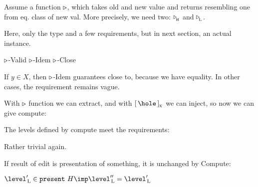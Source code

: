 Assume a function $\triangleright$, which takes old and new value and returns resembling one from eq. class of new val. More precisely, we need two: $\triangleright_{\!_\mathrm{H}}$ and $\triangleright_{\!_\mathrm{L}}$.


Here, only the type and a few requirements, but in next section, an actual instance.


						{$\triangleright$-Valid} 
				{$\triangleright$-Idem} 
		{$\triangleright$-Close} 

If $y \in X$, then {\sc $\triangleright$-Idem} guarantees close to, because we have equality. In other cases, the requirement remains vague.


With $\triangleright$ function we can extract, and with $\eqcl{\hole}{X}$ we can inject, so now we can give compute:


The levels defined by compute meet the requirements:


Rather trivial again.


If result of edit is presentation of something, it is unchanged by {\sc Compute}: 

$\level'\L \in \present~H \imp \level''\L = \level'\L$


